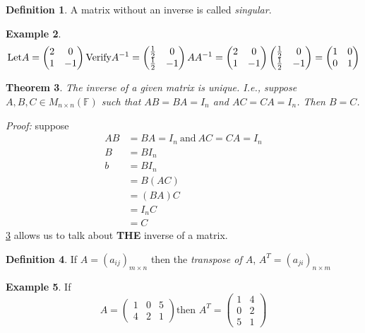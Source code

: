 \documentclass{report}
\newtheorem{theorem}{Theorem}[subsection]
\theoremstyle{remark}
\theoremstyle{definition}
\newtheorem{definition}[theorem]{Definition}
\theoremstyle{definition}
\newtheorem{example}[theorem]{Example}
\theoremstyle{theorem}
\begin{document}
\begin{definition}
A matrix without an inverse is called \emph{singular}.
\end{definition}
\begin{example}
$$\text{Let} A=\begin{pmatrix}2&0\\1&-1\end{pmatrix}\\
\text{Verify} A^{-1} = \begin{pmatrix}\frac{1}{2}&0\\\frac{1}{2}&-1\end{pmatrix}\\
AA^{-1}=\begin{pmatrix}2&0\\1&-1\end{pmatrix}\begin{pmatrix}\frac{1}{2}&0\\ \frac{1}{2}&-1\end{pmatrix} = \begin{pmatrix}1&0\\0&1\end{pmatrix} $$
\end{example}
\begin{theorem}
\label{th:invuniq}
The inverse of a given matrix is unique. I.e., suppose $A,B,C \in M_{n \times n}(\mathbb{F})$ such that $AB=BA=I_n$ and $AC=CA=I_n$. Then $B=C$.
\end{theorem}
\emph{Proof:} suppose
\begin{align*}
AB&=BA=I_n \> \text{and} \> AC=CA=I_n\\
B&=BI_n \\
b&=BI_n\\
&=B(AC)\\
&=(BA)C\\
&=I_nC\\
&=C
\end{align*}
\ref{th:invuniq} allows us to talk about \textbf{THE} inverse of a matrix.
\begin{definition}
If $A=(a_{ij})_{m \times n}$ then the \emph{transpose of $A$}, $A^T=(a_{ji})_{n \times m}$
\end{definition}
\begin{example}
If \[A= \begin{pmatrix}
1&0&5\\
4&2&1
\end{pmatrix} \text{then } A^T= \begin{pmatrix}
1&4\\
0&2\\
5&1
\end{pmatrix} \]
\end{example}
\end{document}
